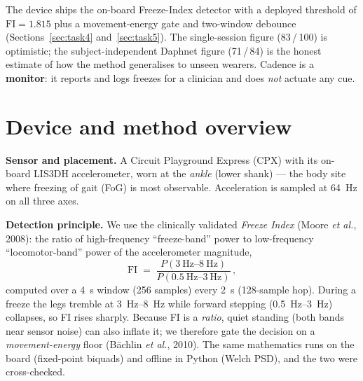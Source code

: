 \documentclass[11pt,a4paper]{article}
\begin{document}
\noindent
The device ships the on-board Freeze-Index detector with a deployed threshold of
$\mathrm{FI}=1.815$ plus a movement-energy gate and two-window debounce
(Sections~\ref{sec:task4} and~\ref{sec:task5}). The single-session figure
(83\,/\,100) is optimistic; the subject-independent Daphnet figure (71\,/\,84) is
the honest estimate of how the method generalises to unseen wearers. Cadence is a
\textbf{monitor}: it reports and logs freezes for a clinician and does \emph{not}
actuate any cue.

\section{Device and method overview}

\textbf{Sensor and placement.} A Circuit Playground Express (CPX) with its on-board
LIS3DH accelerometer, worn at the \emph{ankle} (lower shank) --- the body site where
freezing of gait (FoG) is most observable. Acceleration is sampled at
\SI{64}{\hertz} on all three axes.

\textbf{Detection principle.} We use the clinically validated \emph{Freeze Index}
(Moore \emph{et al.}, 2008): the ratio of high-frequency ``freeze-band'' power to
low-frequency ``locomotor-band'' power of the accelerometer magnitude,
%
\begin{equation}
\mathrm{FI} \;=\; \frac{P(\SIrange{3}{8}{\hertz})}{P(\SIrange{0.5}{3}{\hertz})}\,,
\label{eq:fi}
\end{equation}
%
computed over a \SI{4}{\second} window (256 samples) every \SI{2}{\second}
(128-sample hop). During a freeze the legs tremble at \SIrange{3}{8}{\hertz} while
forward stepping (\SIrange{0.5}{3}{\hertz}) collapses, so FI rises sharply.
Because FI is a \emph{ratio}, quiet standing (both bands near sensor noise) can also
inflate it; we therefore gate the decision on a \emph{movement-energy} floor
(B\"achlin \emph{et al.}, 2010). The same mathematics runs on the board (fixed-point
biquads) and offline in Python (Welch PSD), and the two were cross-checked.
\end{document}

